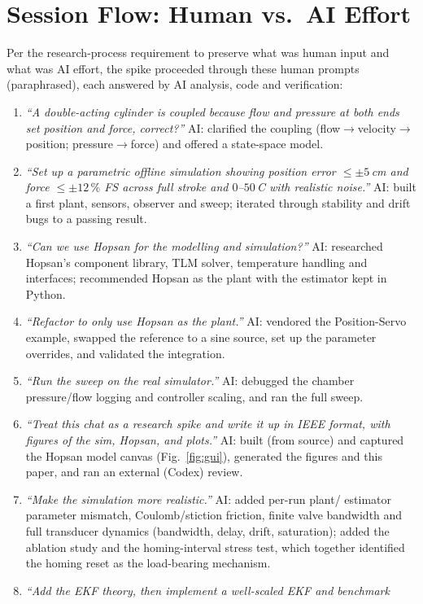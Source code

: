 \section{Session Flow: Human vs.\ AI Effort}\label{app:session}
Per the research-process requirement to preserve what was human input and what
was AI effort, the spike proceeded through these human prompts (paraphrased), each
answered by AI analysis, code and verification:
\begin{enumerate}
\item \emph{``A double-acting cylinder is coupled because flow and pressure at
both ends set position and force, correct?''} AI: clarified the coupling
(flow$\to$velocity$\to$position; pressure$\to$force) and offered a state-space
model.
\item \emph{``Set up a parametric offline simulation showing position error
$\le\pm5$\,cm and force $\le\pm12\,\%$ FS across full stroke and
$0$--$50\,$\textdegree C with realistic noise.''} AI: built a first plant,
sensors, observer and sweep; iterated through stability and drift bugs to a
passing result.
\item \emph{``Can we use Hopsan for the modelling and simulation?''} AI:
researched Hopsan's component library, TLM solver, temperature handling and
interfaces; recommended Hopsan as the plant with the estimator kept in Python.
\item \emph{``Refactor to only use Hopsan as the plant.''} AI: vendored the
Position-Servo example, swapped the reference to a sine source, set up the
parameter overrides, and validated the integration.
\item \emph{``Run the sweep on the real simulator.''} AI: debugged the
chamber pressure/flow logging and controller scaling, and ran the full sweep.
\item \emph{``Treat this chat as a research spike and write it up in IEEE format,
with figures of the sim, Hopsan, and plots.''} AI: built (from source) and
captured the Hopsan model canvas (Fig.~\ref{fig:gui}), generated the figures and
this paper, and ran an external (Codex) review.
\item \emph{``Make the simulation more realistic.''} AI: added per-run plant/
estimator parameter mismatch, Coulomb/stiction friction, finite valve bandwidth
and full transducer dynamics (bandwidth, delay, drift, saturation); added the
ablation study and the homing-interval stress test, which together identified the
homing reset as the load-bearing mechanism.
\item \emph{``Add the EKF theory, then implement a well-scaled EKF and benchmark
}
\end{enumerate}
